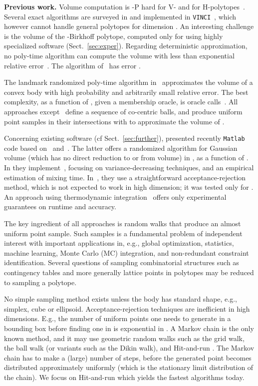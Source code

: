 \documentclass[11pt,a4paper]{article}
\begin{document}
\textbf{Previous work.} 
Volume computation is -P hard for V- and for H-polytopes~\cite{DyerFr88}.
Several exact algorithms are surveyed in
\cite{FukVolume00} and implemented in {\tt VINCI}~\cite{vinci},
which however cannot handle general polytopes for dimension .
An interesting challenge is the volume of the -Birkhoff polytope,
computed only for  using highly specialized software
(Sect.~\ref{sec:exper}).
Regarding deterministic approximation,
no poly-time algorithm can compute the volume with less than
exponential relative error~\cite{Elekes86}.
The algorithm of~\cite{Henk93} has error . 

The landmark randomized poly-time algorithm in~\cite{DyerFrKa91} 
approximates the volume of a convex body with high probability 
and arbitrarily small relative error.
The best complexity, as a function of , given a membership oracle, is  oracle calls~\cite{LovaszVemp06vol}. 
All approaches except~\cite{LovaszVemp06vol}
define a sequence of co-centric balls,
and produce uniform point samples in their intersections with 
to approximate the volume of .

Concerning existing software (cf Sect.~\ref{sec:further}),
\cite{CousinsV13_matlab} presented recently {\tt Matlab} code 
based on~\cite{LovaszVemp06vol} and~\cite{CousinsV13}. The latter offers a
randomized algorithm for Gaussian volume
(which has no direct reduction to or from volume)
in , as a function of .
In \cite{LovaszD12} they implement~\cite{LovaszVemp06vol}, focusing on
variance-decreasing techniques, and
an empirical estimation of mixing time.
In~\cite{LZZ07DirectMC}, they use a straightforward acceptance-rejection
method, which is not expected to work in high dimension;
it was tested only for .
An approach using thermodynamic integration~\cite{Jaekel11} offers only
experimental guarantees on runtime and accuracy.

The key ingredient of all approaches is random walks that produce an
almost uniform point sample.  Such samples is a fundamental problem
of independent interest with important applications in, e.g.,
global optimization, statistics, machine learning,
Monte Carlo (MC) integration, and non-redundant constraint identification.
Several questions of sampling combinatorial structures such as
contingency tables 
and more generally lattice points in polytopes 
may be reduced to sampling a polytope.

No simple sampling method exists unless the body
has standard shape, e.g., simplex, cube or ellipsoid.
Acceptance-rejection techniques are inefficient in high dimensions.
E.g., the number of uniform points one needs to generate in a 
bounding box before finding one in  is exponential in .
A Markov chain is the only known method, and it
may use geometric random walks such as the grid walk,
the ball walk (or variants such as the Dikin walk),
and Hit-and-run \cite{Simonovits03}. 
The Markov chain has to make a (large) number of steps, before the
generated point becomes distributed approximately uniformly
(which is the stationary limit distribution of the chain).
We focus on Hit-and-run which yields the fastest algorithms today.  
\end{document}
